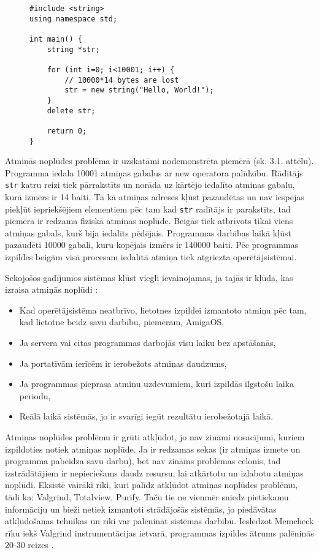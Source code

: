 \begin{figure}[h]
\begin{lstlisting}
#include <string>
using namespace std;

int main() {
    string *str;

    for (int i=0; i<10001; i++) {
        // 10000*14 bytes are lost
        str = new string("Hello, World!");
    }
    delete str;

    return 0;
}
\end{lstlisting}
\caption{\textbf{\fontsize{11}{12}\selectfont {Atmiņas noplūde, C++}}}
\end{figure}

Atmiņās noplūdes problēma ir uzskatāmi nodemonstrēta piemērā (sk. 3.1. attēlu).
Programma  iedala 10001 atmiņas gabalus ar new operatora palīdzību. 
Rādītājs \texttt{str} katru reizi tiek pārrakstīts un norāda uz kārtējo iedalīto atmiņas gabalu, kurā izmērs ir 14 baiti.
Tā kā atmiņas adreses kļūst pazaudētas un nav iespējas piekļūt iepriekšējiem elementiem pēc tam kad  \texttt{str} radītājs ir parakstīts, tad piemēra ir redzama fiziskā atmiņas noplūde.
Beigās tiek atbrīvots tikai viens atmiņas gabals, kurš bija iedalīts pēdējais. 
Programmas darbības laikā kļūst pazaudēti 10000 gabali, kuru kopējais izmērs ir 140000 baiti.
 Pēc programmas izpildes beigām visā procesam iedalītā atmiņa tiek atgriezta operētājsistēmai.


Sekojošos gadījumos sistēmas kļūst viegli ievainojamas, ja tajās ir kļūda, kas izraisa atmiņās noplūdi \cite{RTTV}: 
\begin{itemize}
\item { Kad operētājsistēma neatbrīvo, lietotnes izpildei izmantoto atmiņu pēc tam, kad lietotne beidz savu darbību, piemēram, AmigaOS,}
\item { Ja servera vai citas programmas darbojās visu laiku bez apstāšanās, }
\item { Ja portatīvām ierīcēm ir ierobežots atmiņas daudzums, }
\item { Ja programmas pieprasa atmiņu uzdevumiem, kuri izpildās ilgstošu laika periodu, }
\item { Reālā laikā sistēmās, jo ir svarīgi iegūt rezultātu ierobežotajā laikā. }
\end{itemize}

Atmiņas noplūdes problēmu ir grūti atkļūdot,  jo nav zināmi nosacījumi, kuriem izpildoties notiek atmiņas noplūde. 
Ja ir redzamas sekas (ir atmiņas izmete un programma pabeidza savu darbu), bet nav zināms problēmas cēlonis, tad izstrādātājiem ir nepieciešams daudz resursu, lai atkārtotu un izlabotu atmiņas noplūdi. 
Eksistē vairāki rīki, kuri palīdz atkļūdot atmiņas noplūdes problēmu, tādi ka: Valgrind, Totalview, Purify. 
Taču tie ne vienmēr sniedz pietiekamu informāciju un bieži netiek izmantoti strādājošās sistēmās, jo piedāvātas atkļūdošanas tehnikas un rīki var palēnināt sistēmas darbību.
Ieslēdzot  Memcheck rīku iekš Valgrind instrumentācijas ietvarā, programmas izpildes ātrums palēninās 20-30 reizes \cite{UVD}.



